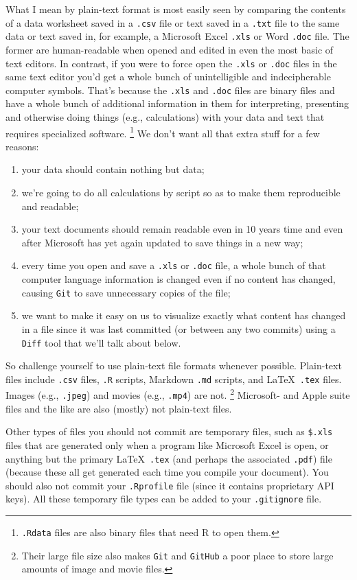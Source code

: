 \documentclass[12pt,letterpaper]{article}
\begin{document}
What I mean by plain-text format is most easily seen by comparing the contents 
of a data worksheet saved in a \texttt{.csv} file or text saved in a \texttt{.txt} file 
to the same data or text saved in, 
for example, a Microsoft Excel \texttt{.xls} or Word \texttt{.doc} file.
The former are human-readable when opened and edited in even the most basic of text editors.
In contrast, if you were to force open the \texttt{.xls} or \texttt{.doc} files in the same text editor you'd get a whole bunch of unintelligible and indecipherable computer symbols.
That's because the \texttt{.xls} and \texttt{.doc} files are binary files and have a 
whole bunch of additional information in them for interpreting, presenting and 
otherwise doing things (e.g., calculations) with your data and text that requires 
specialized software.
\unskip
\footnote{\texttt{.Rdata} files are also binary files that need R to open them.}
We don't want all that extra stuff for a few reasons:
\begin{enumerate}
 	\item your data should contain nothing but data;
	\item we're going to do all calculations by script so as to make them reproducible and readable;
	\item your text documents should remain readable even in 10 years time and 
	even after Microsoft has yet again updated to save things in a new way;
 	\item every time you open and save a \texttt{.xls} or \texttt{.doc} file, a whole 
 	bunch of that computer language information is changed even if no content 
 	has changed, causing \texttt{Git} to save unnecessary copies of the file;
	\item we want to make it easy on us to visualize exactly what content has changed in a file since it was last committed (or between any two commits) using a \texttt{Diff} tool that we'll talk about below.
\end{enumerate}
So challenge yourself to use plain-text file formats whenever possible.
Plain-text files include \texttt{.csv} files, \texttt{.R} scripts, Markdown \texttt{.md} scripts, and \LaTeX\ \texttt{.tex} files.
Images (e.g., \texttt{.jpeg}) and movies (e.g., \texttt{.mp4}) are not.
\unskip
\footnote{Their large file size also makes \texttt{Git} and \texttt{GitHub} a poor 
	place to store large amounts of image and movie files.}
Microsoft- and Apple suite files and the like are also (mostly) not plain-text files.

Other types of files you should not commit are temporary files, such as 
\texttt{\$.xls} files that are generated only when a program like Microsoft Excel 
is open, or anything but the primary \LaTeX\ \texttt{.tex}
(and perhaps the associated \texttt{.pdf}) file
(because these all get generated each time you compile your document).
You should also not commit your \texttt{.Rprofile} file
(since it contains proprietary API keys).
All these temporary file types can be added to your \texttt{.gitignore} file.
\end{document}
